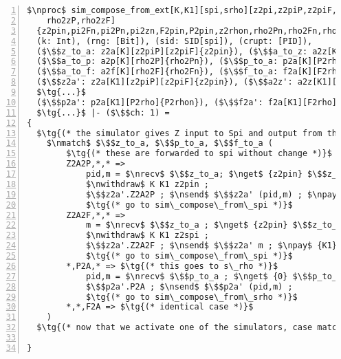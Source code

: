 \begin{figure*}[h]
\begin{lstlisting}[basicstyle=\scriptsize\BeraMonottFamily, frame=single, mathescape, numbers=left, xleftmargin=2em, xrightmargin=2em]
$\nproc$ sim_compose_from_ext[K,K1][spi,srho][z2pi,z2piP,z2piF,z2rho,z2rhoP,z2rhoF,piA2F,piA2P,rhoA2P,rhoA2F,pi2zP,pi2zF,
    rho2zP,rho2zF]
  {z2pin,pi2Fn,pi2Pn,pi2zn,F2pin,P2pin,z2rhon,rho2Pn,rho2Fn,rho2zn,P2rhon,F2rhon,}: 
  (k: Int), (rng: [Bit]), (sid: SID[spi]), (crupt: [PID]), 
  ($\$$z_to_a: z2a[K][z2piP][z2piF]{z2pin}), ($\$$a_to_z: a2z[K][pi2zP][pi2zF]{pi2zn}),
  ($\$$a_to_p: a2p[K][rho2P]{rho2Pn}), ($\$$p_to_a: p2a[K][P2rho]{P2rhon})
  ($\$$a_to_f: a2f[K][rho2F]{rho2Fn}), ($\$$f_to_a: f2a[K][F2rho]{F2rhon}),
  ($\$$z2a': z2a[K1][z2piP][z2piF]{z2pin}), ($\$$a2z': a2z[K1][pi2zP]][pi2zF]{pi2zn}),
  $\tg{...}$
  ($\$$p2a': p2a[K1][P2rho]{P2rhon}), ($\$$f2a': f2a[K1][F2rho]{F2rhon}),
  $\tg{...}$ |- ($\$$ch: 1) =
{
  $\tg{(* the simulator gives Z input to Spi and output from that to Srho *)}$
	$\nmatch$ $\$$z_to_a, $\$$p_to_a, $\$$f_to_a (
		$\tg{(* these are forwarded to spi without change *)}$
		Z2A2P,*,* =>
			pid,m = $\nrecv$ $\$$z_to_a; $\nget$ {z2pin} $\$$z_to_a ;
			$\nwithdraw$ K K1 z2pin ;
			$\$$z2a'.Z2A2P ; $\nsend$ $\$$z2a' (pid,m) ; $\npay$ {K1} z2pin $\$$z2a';
			$\tg{(* go to sim\_compose\_from\_spi *)}$
		Z2A2F,*,* =>
			m = $\nrecv$ $\$$z_to_a ; $\nget$ {z2pin} $\$$z_to_a ;
			$\nwithdraw$ K K1 z2spi ;
			$\$$z2a'.Z2A2F ; $\nsend$ $\$$z2a' m ; $\npay$ {K1} z2pin $\$$z2a';
			$\tg{(* go to sim\_compose\_from\_spi *)}$
		*,P2A,* => $\tg{(* this goes to s\_rho *)}$
			pid,m = $\nrecv$ $\$$p_to_a ; $\nget$ {0} $\$$p_to_a ;
			$\$$p2a'.P2A ; $\nsend$ $\$$p2a' (pid,m) ;
			$\tg{(* go to sim\_compose\_from\_srho *)}$
		*,*,F2A => $\tg{(* identical case *)}$
	)
  $\tg{(* now that we activate one of the simulators, case match on their outgoing channels *)}$

}
\end{lstlisting}
\caption{This shows how the single composition is initialized. The most complicated part is just creating all of the channels that will be used. The next process shows how external messages are read and routed to $\Sim_\pi$ or $\Sim_\rho$ depending on where the input comes from.}
\label{lst:simcomp}
\end{figure*}
